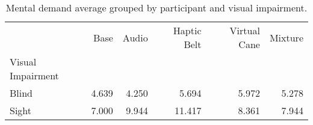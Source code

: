 
\begin{table}[!htb]
\centering
\caption{Mental demand average grouped by participant and visual impairment.}
\label{tab:md_average_group}
\begin{tabular}{lrrrrr}
\toprule
{} &  Base &  Audio &  Haptic Belt &  Virtual Cane &  Mixture \\
Visual Impairment &       &        &              &               &          \\
\midrule
Blind             & 4.639 &  4.250 &        5.694 &         5.972 &    5.278 \\
Sight             & 7.000 &  9.944 &       11.417 &         8.361 &    7.944 \\
\bottomrule
\end{tabular}
\end{table}

